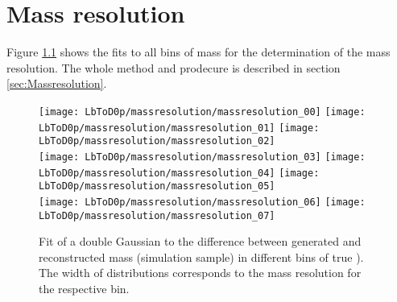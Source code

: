 \chapter{Mass resolution}
\label{app:Massresolution}
Figure \ref{fig:massresolution_all} shows the fits to all bins of \Dz\proton mass for the determination of the mass resolution.
The whole method and prodecure is described in section \ref{sec:Massresolution}.
\begin{figure}[hptb]
    \centering
	\texttt{[image: LbToD0p/massresolution/massresolution\_00]}
	\texttt{[image: LbToD0p/massresolution/massresolution\_01]}
	\texttt{[image: LbToD0p/massresolution/massresolution\_02]} \\
	\texttt{[image: LbToD0p/massresolution/massresolution\_03]}
	\texttt{[image: LbToD0p/massresolution/massresolution\_04]}
	\texttt{[image: LbToD0p/massresolution/massresolution\_05]} \\
	\texttt{[image: LbToD0p/massresolution/massresolution\_06]}
	\texttt{[image: LbToD0p/massresolution/massresolution\_07]}
	\caption{Fit of a double Gaussian to the difference between generated and reconstructed \Dz\proton mass (simulation sample) in different bins of true \Dz\proton). The width of distributions corresponds to the mass resolution for the respective bin.}
    \label{fig:massresolution_all}
\end{figure}

